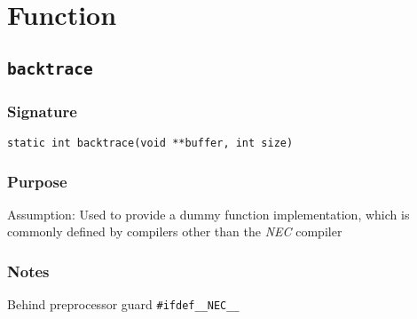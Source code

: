 \section{Function}

\subsection{\texttt{backtrace}}
\vspace{-2ex}
\subsubsection{Signature}
\vspace{-2ex}
\verb|static int backtrace(void **buffer, int size)|

\vspace{-2ex}
\subsubsection{Purpose}
\vspace{-2ex}
Assumption: Used to provide a dummy function implementation, which is commonly defined by compilers other than the \textit{NEC} compiler

\vspace{-2ex}
\subsubsection{Notes}
\vspace{-2ex}
Behind preprocessor guard \verb|#ifdef__NEC__|

